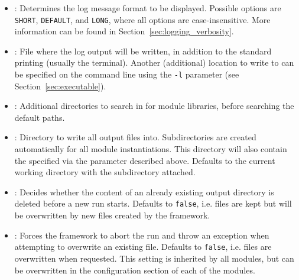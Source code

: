 \begin{itemize}
\item {}: Determines the log message format to be displayed.
Possible options are \texttt{SHORT}, \texttt{DEFAULT}, and \texttt{LONG}, where all options are case-insensitive.
More information can be found in Section~\ref{sec:logging_verbosity}.
\item {}: File where the log output will be written, in addition to the standard printing (usually the terminal).
Another (additional) location to write to can be specified on the command line using the \texttt{-l} parameter (see Section~\ref{sec:executable}).
\item {}: Additional directories to search in for module libraries, before searching the default paths.
\item {}: Directory to write all output files into.
Subdirectories are created automatically for all module instantiations.
This directory will also contain the  specified via the parameter described above.
Defaults to the current working directory with the subdirectory  attached.
\item {}: Decides whether the content of an already existing output directory is deleted before a new run starts. Defaults to \texttt{false}, i.e. files are kept but will be overwritten by new files created by the framework.
\item {}: Forces the framework to abort the run and throw an exception when attempting to overwrite an existing file. Defaults to \texttt{false}, i.e. files are overwritten when requested. This setting is inherited by all modules, but can be overwritten in the configuration section of each of the modules.
\end{itemize}

